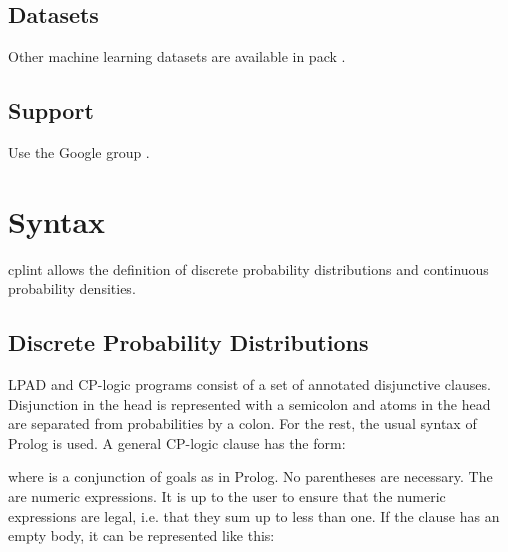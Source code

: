 \documentclass[letterpaper,10pt,english]{sphinxmanual}
\begin{document}
\section{Datasets}
\label{\detokenize{index:datasets}}
Other machine learning datasets are available in pack .


\section{Support}
\label{\detokenize{index:support}}
Use the Google group .


\chapter{Syntax}
\label{\detokenize{index:syntax}}
cplint allows the definition of discrete probability distributions and continuous probability densities.


\section{Discrete Probability Distributions}
\label{\detokenize{index:discrete-probability-distributions}}
LPAD and CP-logic programs consist of a set of annotated disjunctive clauses.
Disjunction in the head is represented with a semicolon and atoms in the head are separated from probabilities by a colon.
For the rest, the usual syntax of Prolog is used.
A general CP-logic clause has the form:

\begin{sphinxVerbatim}[commandchars=\\\{\}]
      
\end{sphinxVerbatim}

where  is a conjunction of goals as in Prolog.
No parentheses are necessary.
The  are numeric expressions.
It is up to the user to ensure that the numeric expressions are legal, i.e. that they sum up to less than one.
If the clause has an empty body, it can be represented like this:

\begin{sphinxVerbatim}[commandchars=\\\{\}]
    
\end{sphinxVerbatim}
\end{document}

